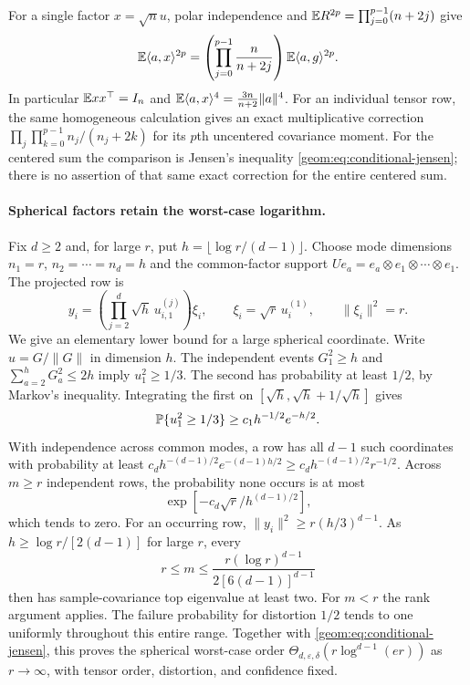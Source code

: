 \documentclass[11pt,a4paper]{article}
\theoremstyle{definition}\newtheorem{definition}[theorem]{Definition}
\theoremstyle{remark}\newtheorem{remark}[theorem]{Remark}
\numberwithin{equation}{section}
\newcommand{\Id}{I}\newcommand{\F}{\mathrm F}
\newcommand{\norm}[1]{\lVert#1\rVert}\newcommand{\ip}[2]{\langle#1,#2\rangle}
\begin{document}
For a single factor $x=\sqrt n u$, polar independence and
$\mathbb E R^{2p}=\prod_{j=0}^{p-1}(n+2j)$ give
\begin{equation}\label{geom:eq:spherical-polar}
 \E\ip ax^{2p}
 =\left(\prod_{j=0}^{p-1}\frac n{n+2j}\right)
       \E\ip ag^{2p}.
\end{equation}
In particular $\E xx^\top=\Id_n$ and
$\E\ip ax^4=\frac{3n}{n+2}\norm a^4$. For an individual tensor row,
the same homogeneous calculation gives an exact multiplicative correction
$\prod_j\prod_{k=0}^{p-1}n_j/(n_j+2k)$ for its $p$th uncentered
covariance moment. For the centered sum the comparison is Jensen's
inequality \eqref{geom:eq:conditional-jensen}; there is no assertion of
that same exact correction for the entire centered sum.

\paragraph{Spherical factors retain the worst-case logarithm.}
\label{proof:spherical-lower}
Fix $d\ge2$ and, for large $r$, put
$h=\lfloor\log r/(d-1)\rfloor$. Choose mode dimensions
$n_1=r$, $n_2=\cdots=n_d=h$ and the common-factor support
$Ue_a=e_a\otimes e_1\otimes\cdots\otimes e_1$.
The projected row is
\[
 y_i=\left(\prod_{j=2}^d\sqrt h\,u_{i,1}^{(j)}\right)\xi_i,
 \qquad \xi_i=\sqrt r\,u_i^{(1)},\qquad \norm{\xi_i}^2=r.
\]
We give an elementary lower bound for a large spherical coordinate.
Write $u=G/\norm G$ in dimension $h$. The independent events
$G_1^2\ge h$ and $\sum_{a=2}^hG_a^2\le2h$ imply $u_1^2\ge1/3$.
The second has probability at least $1/2$, by Markov's inequality.
Integrating the first on $[\sqrt h,\sqrt h+1/\sqrt h]$ gives
\[
 \mathbb P\{u_1^2\ge1/3\}\ge c_1h^{-1/2}e^{-h/2}.
\]
With independence across common modes, a row has all $d-1$ such
coordinates with probability at least
$c_d h^{-(d-1)/2}e^{-(d-1)h/2}
\ge c_d h^{-(d-1)/2}r^{-1/2}$. Across $m\ge r$ independent rows, the
probability none occurs is at most
\[
 \exp[-c_d\sqrt r/h^{(d-1)/2}],
\]
which tends to zero. For an occurring row,
$\norm{y_i}^2\ge r(h/3)^{d-1}$. As
$h\ge\log r/[2(d-1)]$ for large $r$, every
\[
 r\le m\le\frac{r(\log r)^{d-1}}{2[6(d-1)]^{d-1}}
\]
then has sample-covariance top eigenvalue at least two. For $m<r$ the
rank argument applies. The failure probability for distortion $1/2$
tends to one uniformly throughout this entire range. Together with
\eqref{geom:eq:conditional-jensen}, this proves the spherical worst-case
order $\Theta_{d,\varepsilon,\delta}(r\log^{d-1}(er))$ as $r\to\infty$,
with tensor order, distortion, and confidence fixed.
\end{document}
